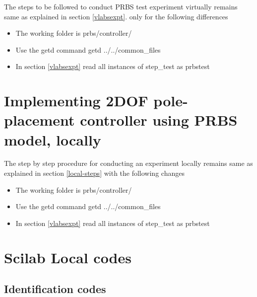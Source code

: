 The steps to be followed to conduct PRBS test experiment virtually remains same as explained in section \ref{vlabsexpt}. only for the following differences
\begin{itemize}
\item The working folder is prbs/controller/
\item Use the getd command getd ../../common\_files
\item In section \ref{vlabsexpt} read all instances of step\_test as prbstest
\end{itemize}

\section{Implementing 2DOF pole-placement controller using PRBS model, locally}
The step by step procedure for conducting an experiment locally remains same as explained in section \ref{local-steps} with the following changes
\begin{itemize}
\item The working folder is prbs/controller/
\item Use the getd command getd ../../common\_files
\item In section \ref{vlabsexpt} read all instances of step\_test as prbstest
\end{itemize}

\section{Scilab Local codes}\label{prbs-local-codes}
\subsection{Identification codes}
\begin{code}

\end{code}

\begin{code}

\end{code}

\begin{code}

\end{code}

